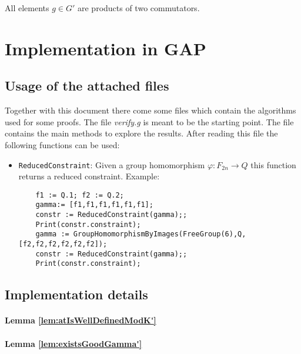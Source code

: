 \documentclass[a4paper,11pt]{amsart}
\begin{document}
\begin{cor}
 All elements $g\in G'$ are products of two commutators.
\end{cor}

\section{Implementation in GAP}
\subsection{Usage of the attached files}
Together with this document there come some files which contain the algorithms used for some proofs.
The file \emph{verify.g} is meant to be the starting point. The file contains the main methods to explore the results.
After reading this file the following functions can be used:
\begin{itemize}
 \item \lstinline{ReducedConstraint}: Given a group homomorphism $\varphi\colon F_{2n} \to Q$ this function returns a reduced constraint.
 Example: 
 \begin{lstlisting}
    f1 := Q.1; f2 := Q.2;
    gamma:= [f1,f1,f1,f1,f1,f1];
    constr := ReducedConstraint(gamma);;
    Print(constr.constraint);
    gamma := GroupHomomorphismByImages(FreeGroup(6),Q,[f2,f2,f2,f2,f2,f2]);
    constr := ReducedConstraint(gamma);;
    Print(constr.constraint);
\end{lstlisting} 
\end{itemize}

\subsection{Implementation details}
\paragraph{Lemma \ref{lem:atIsWellDefinedModK'}}
\paragraph{Lemma \ref{lem:existsGoodGamma'}}

{}

\appendix
% 
%
\end{document}
